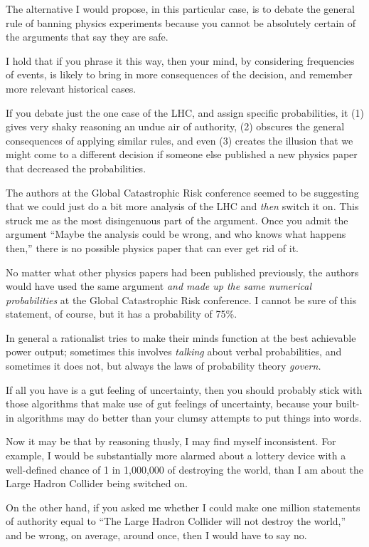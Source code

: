 {
 The alternative I would propose, in this particular case, is to
debate the general rule of banning physics experiments because you
cannot be absolutely certain of the arguments that say they are safe.}

{
 I hold that if you phrase it this way, then your mind, by
considering frequencies of events, is likely to bring in more
consequences of the decision, and remember more relevant historical
cases.}

{
 If you debate just the one case of the LHC, and assign specific
probabilities, it (1) gives very shaky reasoning an undue air of
authority, (2) obscures the general consequences of applying similar
rules, and even (3) creates the illusion that we might come to a
different decision if someone else published a new physics paper that
decreased the probabilities.}

{
 The authors at the Global Catastrophic Risk conference seemed to
be suggesting that we could just do a bit more analysis of the LHC and
\textit{then} switch it on. This struck me as the most disingenuous
part of the argument. Once you admit the argument
``Maybe the analysis could be wrong, and who knows
what happens then,'' there is no possible physics
paper that can ever get rid of it.}

{
 No matter what other physics papers had been published previously,
the authors would have used the same argument \textit{and made up the
same numerical probabilities} at the Global Catastrophic Risk
conference. I cannot be sure of this statement, of course, but it has a
probability of 75\%.}

{
 In general a rationalist tries to make their minds function at the
best achievable power output; sometimes this involves \textit{talking}
about verbal probabilities, and sometimes it does not, but always the
laws of probability theory \textit{govern.}}

{
 If all you have is a gut feeling of uncertainty, then you should
probably stick with those algorithms that make use of gut feelings of
uncertainty, because your built-in algorithms may do better than your
clumsy attempts to put things into words.}

{
 Now it may be that by reasoning thusly, I may find myself
inconsistent. For example, I would be substantially more alarmed about
a lottery device with a well-defined chance of 1 in 1,000,000 of
destroying the world, than I am about the Large Hadron Collider being
switched on.}

{
 On the other hand, if you asked me whether I could make one
million statements of authority equal to ``The Large
Hadron Collider will not destroy the world,'' and be
wrong, on average, around once, then I would have to say no.}

